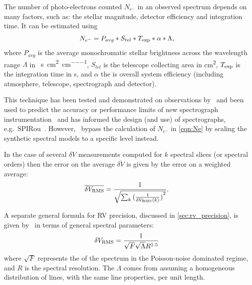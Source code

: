 The number of photo-electrons counted \(N_{{e}^{-}}\) in an observed spectrum depends on many factors, such as: the stellar magnitude, detector efficiency and integration time.
It can be estimated using
\begin{equation}
N_{{e}^{-}} = P_{avg} * S_{tel} * T_{\textrm{exp}} * \alpha* \Lambda, \label{eqn:Ne}
\end{equation}
where \(P_{avg}\) is the average monochromatic stellar brightness
across the wavelength range \(\Lambda\) in {\si{\photons\per\second\per\centi\metre\squared\per\centi\metre}},
\(S_{tel}\) is the telescope collecting area in \si{\centi\metre\squared},
\(T_{\textrm{exp}}\) is the integration time in \si{\second}, and \(\alpha\) the is overall system efficiency (including atmosphere, telescope, spectrograph and detector).

This technique has been tested and demonstrated on observations by~\citet{connes_demonstration_1996} and been used to predict the accuracy or performance limits of new spectrograph instrumentation~\citep[e.g.][]{connes_absolute_1985,butler_attaining_1996,bouchy_fundamental_2001} and has informed the design (and use) of spectrographs, e.g.\ {SPIRou}~\citep{artigau_spirou_2014,figueira_radial_2016}.
However,~\citet{figueira_radial_2016} bypass the calculation of \(N_{{e}^{-}}\) in \cref{eqn:Ne} by scaling the synthetic spectral models to a specific \snr{} level instead.

In the case of several \(\delta V\) measurements computed for \(k\) spectral slices (or spectral orders) then the error on the average \(\overline{\delta V}\) is given by the error on a weighted average:
\begin{equation}
\overline{\delta {V}_{\textrm{RMS}}} = \frac{1}{\sqrt{\sum_k{{(\frac{1}{\delta V_{\textrm{RMS}}(k)})}^{2}}}}. \label{eqn:weighted_average_error}
\end{equation}

A separate general formula for {RV} precision, discussed in \cref{sec:rv_precision}, is given by~\citet{hatzes_spectrograph_1992} in terms of general spectral parameters:
\begin{equation}
\delta V_{\textrm{RMS}} = \frac{1}{\sqrt{F} \sqrt{\Lambda} {R}^{1.5}}
\end{equation}
where $\sqrt{F}$ represents the \snr{} of the spectrum in the {Poisson}-noise dominated regime, and \(R\) is the spectral resolution.
The $\Lambda$ comes from assuming a homogeneous distribution of lines, with the same line properties, per unit length.

